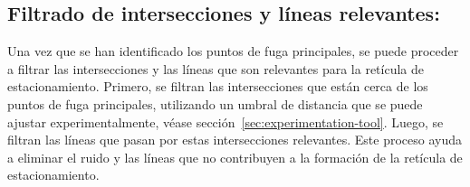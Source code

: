 

\subsection{Filtrado de intersecciones y líneas relevantes:}

Una vez que se han identificado los puntos de fuga principales, se puede proceder a filtrar las intersecciones y las líneas que son
relevantes para la retícula de estacionamiento.
Primero, se filtran las intersecciones que están cerca de los puntos de fuga principales, utilizando un umbral de distancia que se puede ajustar experimentalmente, véase sección~\ref{sec:experimentation-tool}.
Luego, se filtran las líneas que pasan por estas intersecciones relevantes.
Este proceso ayuda a eliminar el ruido y las líneas que no contribuyen a la formación de la retícula de estacionamiento.
